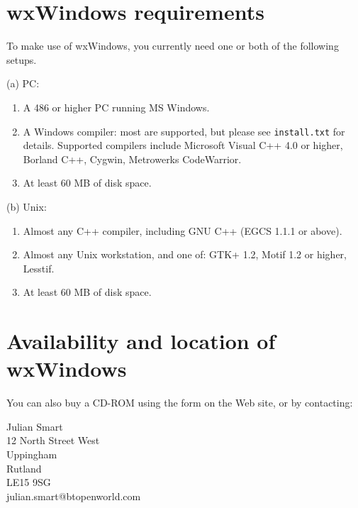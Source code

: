 \section{wxWindows requirements}\label{requirements}

To make use of wxWindows, you currently need one or both of the
following setups.

(a) PC:

\begin{enumerate}\itemsep=0pt
\item A 486 or higher PC running MS Windows.
\item A Windows compiler: most are supported, but please see {\tt install.txt} for
details. Supported compilers include Microsoft Visual C++ 4.0 or higher, Borland C++, Cygwin,
Metrowerks CodeWarrior.
\item At least 60 MB of disk space.
\end{enumerate}

(b) Unix:

\begin{enumerate}\itemsep=0pt
\item Almost any C++ compiler, including GNU C++ (EGCS 1.1.1 or above).
\item Almost any Unix workstation, and one of: GTK+ 1.2, Motif 1.2 or higher, Lesstif.
\item At least 60 MB of disk space.
\end{enumerate}

\section{Availability and location of wxWindows}


You can also buy a CD-ROM using the form on the Web site, or by contacting:

Julian Smart\\
12 North Street West\\
Uppingham\\
Rutland\\
LE15 9SG\\
julian.smart@btopenworld.com

